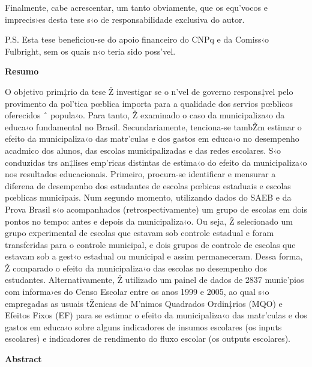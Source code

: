 \documentclass[a4paper, 12pt]{article}
\begin{document}
Finalmente, cabe acrescentar, um tanto obviamente, que os equ’vocos e imprecis›es desta tese s‹o de responsabilidade exclusiva do autor. 

P.S. Esta tese beneficiou-se do apoio financeiro do CNPq e da Comiss‹o Fulbright, sem os quais n‹o teria sido poss’vel. 

\pagebreak

\sf \pagestyle{plain}
\thispagestyle{empty}
\doublespacing
\begin{center}
\textbf{Resumo}
\end{center}


O objetivo prim‡rio da tese Ž investigar se o n’vel de governo respons‡vel pelo provimento da pol’tica pœblica importa para a qualidade dos servios pœblicos oferecidos ˆ popula‹o.  Para tanto, Ž examinado o caso da municipaliza‹o da educa‹o fundamental no Brasil. Secundariamente, tenciona-se tambŽm estimar o efeito da municipaliza‹o das matr’culas e dos gastos em educa‹o no desempenho acadmico dos alunos, das escolas municipalizadas e das redes escolares. S‹o conduzidas trs an‡lises emp’ricas distintas de estima‹o do efeito da municipaliza‹o nos resultados educacionais. Primeiro, procura-se identificar e mensurar a diferena de desempenho dos estudantes de escolas pœbicas estaduais e escolas pœblicas municipais. Num segundo momento, utilizando dados do SAEB e da Prova Brasil s‹o acompanhados (retrospectivamente) um grupo de escolas em dois pontos no tempo: antes e depois da municipaliza‹o. Ou seja, Ž selecionado um grupo experimental de escolas que estavam sob controle estadual e foram transferidas para o controle municipal, e dois grupos de controle de escolas que estavam sob a gest‹o estadual ou municipal e assim permaneceram. Dessa forma, Ž comparado o efeito da municipaliza‹o das escolas no desempenho dos estudantes. Alternativamente, Ž utilizado um painel de dados de 2837 munic’pios com informa›es do Censo Escolar entre os anos 1999 e 2005, ao qual s‹o empregadas as usuais tŽcnicas de M’nimos Quadrados Ordin‡rios (MQO) e Efeitos Fixos (EF) para se estimar o efeito da municipaliza‹o das matr’culas e dos gastos em educa‹o sobre alguns indicadores de insumos escolares (os inputs escolares) e indicadores de rendimento do fluxo escolar (os outputs escolares).

\pagebreak

\sf \pagestyle{plain}
\thispagestyle{empty}
\doublespacing
\begin{center}
\textbf{Abstract}
\end{center}
\end{document}
